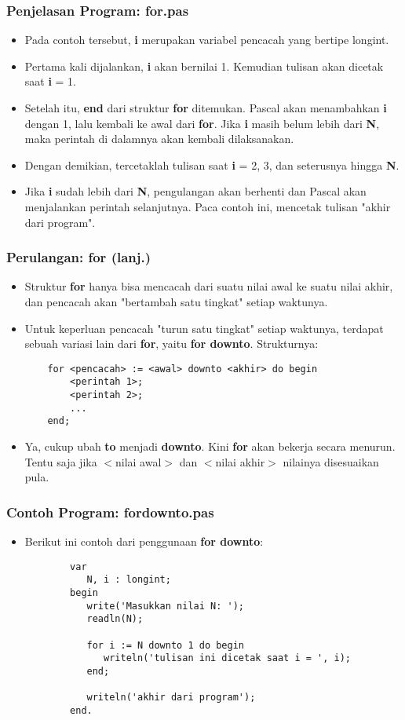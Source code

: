 \documentclass{beamer}
\begin{document}
\begin{frame}
\frametitle{Penjelasan Program: for.pas}
\begin{itemize}
	\item Pada contoh tersebut, \textbf{i} merupakan variabel pencacah yang bertipe longint.
	\item Pertama kali dijalankan, \textbf{i} akan bernilai 1. Kemudian tulisan akan dicetak saat \textbf{i} = 1.
	\item Setelah itu, \textbf{end} dari struktur \textbf{for} ditemukan. Pascal akan menambahkan \textbf{i} dengan 1, lalu kembali ke awal dari \textbf{for}. Jika \textbf{i} masih belum lebih dari \textbf{N}, maka perintah di dalamnya akan kembali dilaksanakan.
	\item Dengan demikian, tercetaklah tulisan saat \textbf{i} = 2, 3, dan seterusnya hingga \textbf{N}.
	\item Jika \textbf{i} sudah lebih dari \textbf{N}, pengulangan akan berhenti dan Pascal akan menjalankan perintah selanjutnya. Paca contoh ini, mencetak tulisan "akhir dari program".
\end{itemize}
\end{frame}

\begin{frame}[fragile]
\frametitle{Perulangan: for (lanj.)}
\begin{itemize}
	\item Struktur \textbf{for} hanya bisa mencacah dari suatu nilai awal ke suatu nilai akhir, dan pencacah akan "bertambah satu tingkat" setiap waktunya.
	\item Untuk keperluan pencacah "turun satu tingkat" setiap waktunya, terdapat sebuah variasi lain dari \textbf{for}, yaitu \textbf{for downto}. Strukturnya:
	\begin{lstlisting}
	for <pencacah> := <awal> downto <akhir> do begin
	    <perintah 1>;
	    <perintah 2>;
	    ...
	end;
	\end{lstlisting}
	\item Ya, cukup ubah \alert{\textbf{to}} menjadi \alert{\textbf{downto}}. Kini \textbf{for} akan bekerja secara menurun. Tentu saja jika $<$nilai awal$>$ dan $<$nilai akhir$>$ nilainya disesuaikan pula.
\end{itemize}
\end{frame}

\begin{frame}[fragile]
\frametitle{Contoh Program: fordownto.pas}
\begin{itemize}
	\item Berikut ini contoh dari penggunaan \textbf{for downto}:
	\begin{lstlisting}
		var
		   N, i : longint;
		begin
		   write('Masukkan nilai N: ');
		   readln(N);
		
		   for i := N downto 1 do begin
		      writeln('tulisan ini dicetak saat i = ', i);
		   end;
		
		   writeln('akhir dari program');
		end.
	\end{lstlisting}
\end{itemize}
\end{frame}
\end{document}
